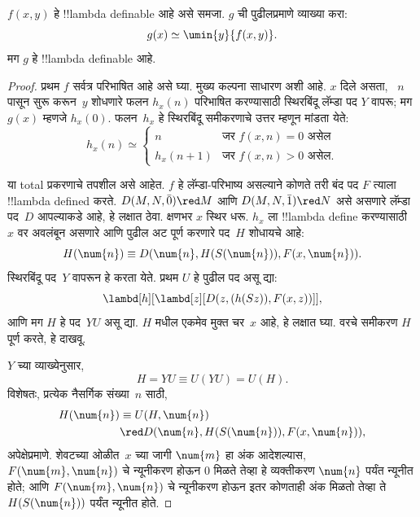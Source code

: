 \documentclass[../../../include/open-logic-section]{subfiles}
\begin{document}

\begin{lem}
$f(x,y)$ हे !!{lambda definable} आहे असे समजा.
$g$ ची पुढीलप्रमाणे व्याख्या करा:
\[
g(x) \simeq \umin{y}{f(x,y)}.
\]
मग $g$ हे !!{lambda definable} आहे.
\end{lem}

\begin{proof}
प्रथम $f$ सर्वत्र परिभाषित आहे असे घ्या. मुख्य कल्पना साधारण अशी आहे. $x$ दिले असता,
~$n$ पासून सुरू करून~$y$ शोधणारे फलन $h_x(n)$
परिभाषित करण्यासाठी स्थिरबिंदू लॅम्डा पद $Y$ वापरू;
मग $g(x)$ म्हणजे $h_x(0)$. फलन~$h_x$ हे
स्थिरबिंदू समीकरणाचे उत्तर म्हणून मांडता येते:
\[
h_x(n) \simeq
\begin{cases}
n & \text{जर $f(x,n) = 0$ असेल} \\
h_x(n+1) & \text{जर $f(x,n)>0$ असेल.}
\end{cases}
\]

या total प्रकरणाचे तपशील असे आहेत. $f$ हे लॅम्डा-परिभाष्य असल्याने
कोणते तरी बंद पद $F$ त्याला !!{lambda defined} करते.
$D(M, N, \bar{0}) \red M$ आणि $D(M, N, \bar{1})
\red N$ असे असणारे लॅम्डा पद~$D$ आपल्याकडे आहे,
हे लक्षात ठेवा. क्षणभर $x$ स्थिर धरू. $h_x$ ला
!!{lambda define} करण्यासाठी~$x$ वर अवलंबून असणारे
आणि पुढील अट पूर्ण करणारे पद~$H$ शोधायचे आहे:
\[
H(\num{n}) \equiv D(\num{n}, H(S(\num{n})), F(x, \num{n})).
\]
स्थिरबिंदू पद~$Y$ वापरून हे करता येते. प्रथम $U$
हे पुढील पद असू द्या:
\[
\lambd[h][\lambd[z][D(z,(h(Sz)),F(x,z))]],
\]
आणि मग $H$ हे पद~$YU$ असू द्या. $H$ मधील
एकमेव मुक्त चर~$x$ आहे, हे लक्षात घ्या. वरचे
समीकरण $H$ पूर्ण करते, हे दाखवू.

$Y$ च्या व्याख्येनुसार,
\[
H = YU \equiv U(YU) = U(H).
\]
विशेषतः, प्रत्येक नैसर्गिक संख्या~$n$ साठी,
\begin{align*}
H(\num{n}) & \equiv U(H, \num{n}) \\
& \red D(\num{n}, H(S(\num{n})), F(x, \num{n})),
\end{align*}
अपेक्षेप्रमाणे. शेवटच्या ओळीत~$x$ च्या जागी
$\num{m}$ हा अंक आदेशल्यास,
$F(\num{m}, \num{n})$ चे न्यूनीकरण होऊन
$\num{0}$ मिळते तेव्हा हे व्यक्तीकरण $\num{n}$
पर्यंत न्यूनीत होते; आणि $F(\num{m}, \num{n})$
चे न्यूनीकरण होऊन इतर कोणताही अंक मिळतो तेव्हा
ते $H(S(\num{n}))$ पर्यंत न्यूनीत होते.


\end{proof}
\end{document}
